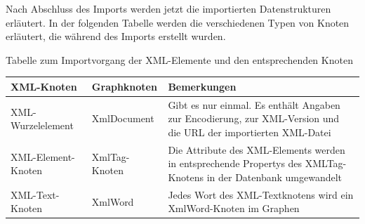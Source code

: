 \documentclass[ngerman,]{scrreprt}
\begin{document}
Nach Abschluss des Imports werden jetzt die importierten Datenstrukturen erläutert. In der folgenden Tabelle werden die verschiedenen Typen von Knoten erläutert, die während des Imports erstellt wurden.

Tabelle zum Importvorgang der XML-Elemente und den entsprechenden Knoten

\begin{longtable}[]{@{}lll@{}}
\toprule
\begin{minipage}[b]{0.24\columnwidth}\raggedright\strut
XML-Knoten\strut
\end{minipage} & \begin{minipage}[b]{0.23\columnwidth}\raggedright\strut
Graphknoten\strut
\end{minipage} & \begin{minipage}[b]{0.44\columnwidth}\raggedright\strut
Bemerkungen\strut
\end{minipage}\tabularnewline
\midrule
\endhead
\begin{minipage}[t]{0.24\columnwidth}\raggedright\strut
XML-Wurzelelement\strut
\end{minipage} & \begin{minipage}[t]{0.23\columnwidth}\raggedright\strut
XmlDocument\strut
\end{minipage} & \begin{minipage}[t]{0.44\columnwidth}\raggedright\strut
Gibt es nur einmal. Es enthält Angaben zur Encodierung, zur XML-Version und die URL der importierten XML-Datei\strut
\end{minipage}\tabularnewline
\begin{minipage}[t]{0.24\columnwidth}\raggedright\strut
XML-Element-Knoten\strut
\end{minipage} & \begin{minipage}[t]{0.23\columnwidth}\raggedright\strut
XmlTag-Knoten\strut
\end{minipage} & \begin{minipage}[t]{0.44\columnwidth}\raggedright\strut
Die Attribute des XML-Elements werden in entsprechende Propertys des XMLTag-Knotens in der Datenbank umgewandelt\strut
\end{minipage}\tabularnewline
\begin{minipage}[t]{0.24\columnwidth}\raggedright\strut
XML-Text-Knoten\strut
\end{minipage} & \begin{minipage}[t]{0.23\columnwidth}\raggedright\strut
XmlWord\strut
\end{minipage} & \begin{minipage}[t]{0.44\columnwidth}\raggedright\strut
Jedes Wort des XML-Textknotens wird ein XmlWord-Knoten im Graphen\strut
\end{minipage}\tabularnewline
\bottomrule
\end{longtable}
\end{document}
